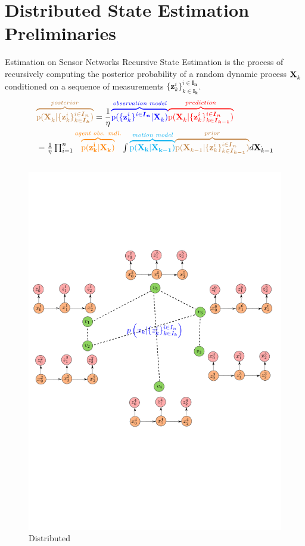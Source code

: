 \documentclass{beamer}
\newcommand{\vect}{\bf}
\theoremstyle{remark}
\newcommand{\XX}[3][2]{\mathbf{X}_{\tiny #2}^{\tiny #3}}
\newcommand{\pr}{\textrm{p}}
\newcommand{\bIn}{\boldsymbol{I}_{\boldsymbol{n}}}
\newcommand{\bIk}{\boldsymbol{I}_{\boldsymbol{k}}}
\newcommand{\bIkk}{\boldsymbol{I}_{\boldsymbol{k-1}}}
\newcommand{\zz}[3][2]{\mathbf{z}_{ #2}^{ #3}}
\begin{document}
\section{Distributed State Estimation Preliminaries} 
\begin{frame}{Estimation on Sensor Networks}
\label{subsec:Preliminaries}
{\color{red} Recursive State Estimation}
 is the process of recursively computing the posterior probability of a random dynamic process $\XX[]{k}{}$ conditioned on a sequence of measurements $\{\zz{k}{i}\}^{i\in\bIn}_{k\in\bIk}$. 
	\begin{align*}
	& {\color{brown}\overbrace{\textstyle \pr(\XX[]{k}{}|\{\zz{k}{i}\}^{i\in\bIn}_{k\in\bIk}) }^{posterior}}  = \frac{1}{\eta}  
	{\color{blue}\overbrace{\pr(\{\zz{k}{i}\}^{i\in\bIn}| \XX[]{k}{})}^{\textit{observation model}\textbf{}}}
			{\color{red}\overbrace{\pr(\XX[]{k}{}|\{\zz{k}{i}\}^{i\in\bIn}_{k\in\bIkk})}^{prediction}} \\
	&\textstyle = \frac{1}{\eta}\prod_{i=1}^{n} 
	{\color{orange}\overbrace{\pr(\vect{z}_{k}^i | \XX[]{k}{})}^{\textit{agent obs. mdl.}}} \int {\color{cyan}\overbrace{\pr(\vect{X}_{k} | \XX[]{k-1}{})}^{\textit{motion model}}} {\color{brown}\overbrace{\pr(\XX[]{k-1}{}|\{\zz{k}{i}\}^{i\in\bIn}_{k\in\bIkk})}^{prior}}d\XX[]{k-1}.
	\end{align*}
\vspace{-0.9cm}
\begin{columns}
	\begin{column}{.48\textwidth}
		\begin{figure}
			\centering
			\includegraphics[trim={0cm 8cm 0cm 8cm},clip,width=0.8\linewidth]{drawing.png}
			\vspace{-0.7cm}
			\caption*{Distributed}
			\label{fig:fu}
		\end{figure}
	\end{column}
	

\end{columns}
\end{frame}
\end{document}
